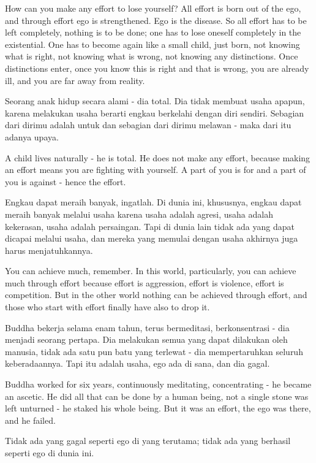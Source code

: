 \english
How can you make any effort to lose yourself? All effort is born out of the ego, and through effort ego is strengthened. Ego is the disease. So all effort has to be left completely, nothing is to be done; one has to lose oneself completely in the existential. One has to become again like a small child, just born, not knowing what is right, not knowing what is wrong, not knowing any distinctions. Once distinctions enter, once you know this is right and that is wrong, you are already ill, and you are far away from reality.

\bahasa
Seorang anak hidup secara alami - dia total. Dia tidak membuat usaha apapun, karena melakukan usaha berarti engkau berkelahi dengan diri sendiri. Sebagian dari dirimu adalah untuk dan sebagian dari dirimu melawan - maka dari itu adanya upaya.

\english
A child lives naturally - he is total. He does not make any effort, because making an effort means you are fighting with yourself. A part of you is for and a part of you is against - hence the effort.

\bahasa
Engkau dapat meraih banyak, ingatlah. Di dunia ini, khususnya, engkau dapat meraih banyak melalui usaha karena usaha adalah agresi, usaha adalah kekerasan, usaha adalah persaingan. Tapi di dunia lain tidak ada yang dapat dicapai melalui usaha, dan mereka yang memulai dengan usaha akhirnya juga harus menjatuhkannya.

\english
You can achieve much, remember. In this world, particularly, you can achieve much through effort because effort is aggression, effort is violence, effort is competition. But in the other world nothing can be achieved through effort, and those who start with effort finally have also to drop it.

\bahasa
Buddha bekerja selama enam tahun, terus bermeditasi, berkonsentrasi - dia menjadi seorang pertapa. Dia melakukan semua yang dapat dilakukan oleh manusia, tidak ada satu pun batu yang terlewat - dia mempertaruhkan seluruh keberadaannya. Tapi itu adalah usaha, ego ada di sana, dan dia gagal.

\english
Buddha worked for six years, continuously meditating, concentrating - he became an ascetic. He did all that can be done by a human being, not a single stone was left unturned - he staked his whole being. But it was an effort, the ego was there, and he failed.

\bahasa
Tidak ada yang gagal seperti ego di yang terutama; tidak ada yang berhasil seperti ego di dunia ini.

